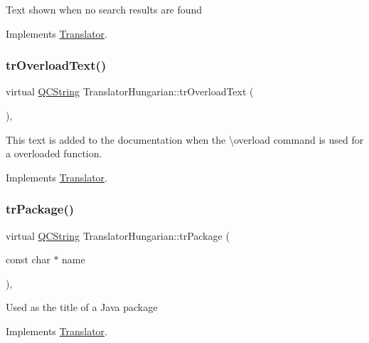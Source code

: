 Text shown when no search results are found 

Implements \mbox{\hyperlink{class_translator}{Translator}}.

\mbox{\label{class_translator_hungarian_ae753aff4068b68d25b1df5bb96059a44}} 
\subsubsection{\texorpdfstring{trOverloadText()}{trOverloadText()}}
{\footnotesize\ttfamily virtual \mbox{\hyperlink{class_q_c_string}{Q\+C\+String}} Translator\+Hungarian\+::tr\+Overload\+Text (\begin{DoxyParamCaption}{ }\end{DoxyParamCaption})\hspace{0.3cm}{\ttfamily [inline]}, {\ttfamily [virtual]}}

This text is added to the documentation when the \textbackslash{}overload command is used for a overloaded function. 

Implements \mbox{\hyperlink{class_translator}{Translator}}.

\mbox{\label{class_translator_hungarian_ae1ae8f3c99147763e70c1c050f8af2be}} 
\subsubsection{\texorpdfstring{trPackage()}{trPackage()}}
{\footnotesize\ttfamily virtual \mbox{\hyperlink{class_q_c_string}{Q\+C\+String}} Translator\+Hungarian\+::tr\+Package (\begin{DoxyParamCaption}\item[{const char $\ast$}]{name }\end{DoxyParamCaption})\hspace{0.3cm}{\ttfamily [inline]}, {\ttfamily [virtual]}}

Used as the title of a Java package 

Implements \mbox{\hyperlink{class_translator}{Translator}}.

\mbox{\label{class_translator_hungarian_a80f3b287337999077604dae55e846ed1}} 
